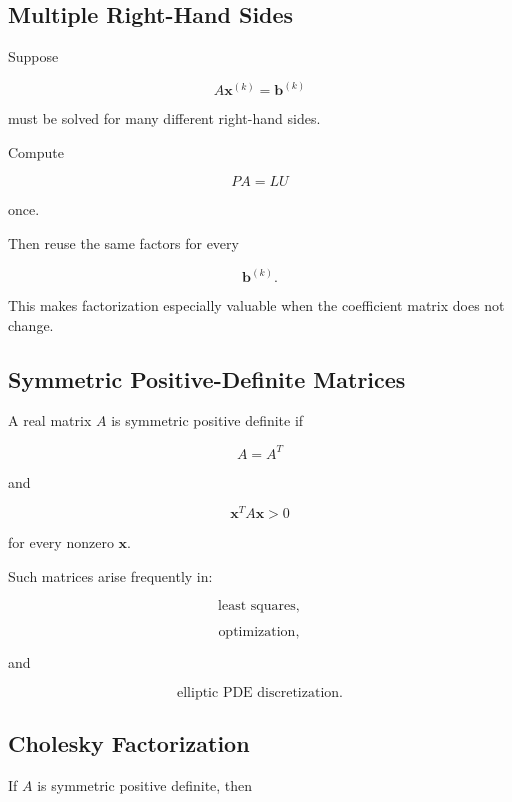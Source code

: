 \subsection{Multiple Right-Hand Sides}
\label{subsec:multiple-right-hand-sides}

Suppose

\[
A\mathbf{x}^{(k)}
=
\mathbf{b}^{(k)}
\]

must be solved for many different right-hand sides.

Compute

\[
PA=LU
\]

once.

Then reuse the same factors for every

\[
\mathbf{b}^{(k)}.
\]

This makes factorization especially valuable when the coefficient matrix
does not change.

\subsection{Symmetric Positive-Definite Matrices}
\label{subsec:symmetric-positive-definite}

A real matrix \(A\) is symmetric positive definite if

\[
\boxed{
A=A^T
}
\]

and

\[
\boxed{
\mathbf{x}^TA\mathbf{x}>0
}
\]

for every nonzero \(\mathbf{x}\).

Such matrices arise frequently in:

\[
\boxed{
\text{least squares},
}
\]

\[
\boxed{
\text{optimization},
}
\]

and

\[
\boxed{
\text{elliptic PDE discretization}.
}
\]

\subsection{Cholesky Factorization}
\label{subsec:cholesky-factorization}

If \(A\) is symmetric positive definite, then

